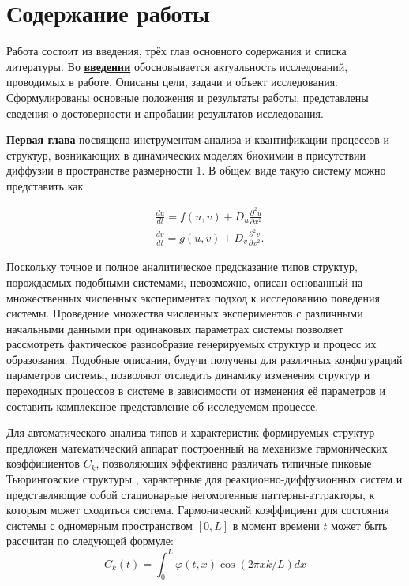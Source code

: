 \section*{Содержание работы}
Работа состоит из введения, трёх глав основного содержания и списка литературы. 
Во \underline{\textbf{введении}} обосновывается актуальность
исследований, проводимых в работе. Описаны цели, задачи и объект исследования. 
Сформулированы основные положения и результаты работы,
представлены сведения о достоверности и апробации результатов исследования. 

\underline{\textbf{Первая глава}} посвящена инструментам анализа и квантификации процессов и структур, возникающих в динамических моделях биохимии в присутствии диффузии в пространстве размерности 1. В общем виде такую систему можно представить как

\begin{equation}
    \begin{aligned}
        & \frac{d u}{d t}=f(u,v)+D_u \frac{\partial^2 u}{\partial x^2} \\
        & \frac{d v}{d t}=g(u,v)+D_v \frac{\partial^2 v}{\partial x^2} .
        \end{aligned}
    \label{eq:generic_system}
\end{equation}

Поскольку точное и полное аналитическое предсказание типов структур, порождаемых подобными системами, невозможно, описан основанный на множественных численных экспериментах подход к исследованию поведения системы. Проведение множества численных экспериментов с различными начальными данными при одинаковых параметрах системы позволяет рассмотреть фактическое разнообразие генерируемых структур и процесс их образования. Подобные описания, будучи получены для различных конфигураций параметров системы, позволяют отследить динамику изменения структур и переходных процессов в системе в зависимости от изменения её параметров и составить комплексное представление об исследуемом процессе.

Для автоматического анализа типов и характеристик формируемых структур предложен математический аппарат построенный на механизме гармонических коэффициентов $C_k$, позволяющих эффективно различать типичные пиковые Тьюринговские структуры \cite{turing1990chemical}, характерные для реакционно-диффузионных систем и представляющие собой стационарные негомогенные паттерны-аттракторы, к которым может сходиться система. Гармонический коэффициент для состояния системы с одномерным пространством $[0, L]$ в момент времени $t$ может быть рассчитан по следующей формуле:
\begin{equation}
    C_k(t) = \int_0^L \varphi(t, x) \cos (2 \pi x k / L) d x
\end{equation}

